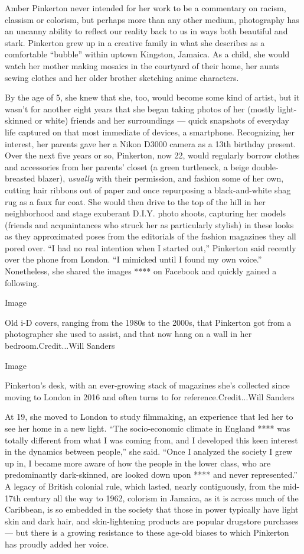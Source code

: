 Amber Pinkerton never intended for her work to be a commentary on
racism, classism or colorism, but perhaps more than any other medium,
photography has an uncanny ability to reflect our reality back to us in
ways both beautiful and stark. Pinkerton grew up in a creative family in
what she describes as a comfortable ``bubble'' within uptown Kingston,
Jamaica. As a child, she would watch her mother making mosaics in the
courtyard of their home, her aunts sewing clothes and her older brother
sketching anime characters.

By the age of 5, she knew that she, too, would become some kind of
artist, but it wasn't for another eight years that she began taking
photos of her (mostly light-skinned or white) friends and her
surroundings --- quick snapshots of everyday life captured on that most
immediate of devices, a smartphone. Recognizing her interest, her
parents gave her a Nikon D3000 camera as a 13th birthday present. Over
the next five years or so, Pinkerton, now 22, would regularly borrow
clothes and accessories from her parents' closet (a green turtleneck, a
beige double-breasted blazer), \emph{usually} with their permission, and
fashion some of her own, cutting hair ribbons out of paper and once
repurposing a black-and-white shag rug as a faux fur coat. She would
then drive to the top of the hill in her neighborhood and stage
exuberant D.I.Y. photo shoots, capturing her models (friends and
acquaintances who struck her as particularly stylish) in these looks as
they approximated poses from the editorials of the fashion magazines
they all pored over. ``I had no real intention when I started out,''
Pinkerton said recently over the phone from London. ``I mimicked until I
found my own voice.'' Nonetheless, she shared the images **** on
Facebook and quickly gained a following.

Image

Old i-D covers, ranging from the 1980s to the 2000s, that Pinkerton got
from a photographer she used to assist, and that now hang on a wall in
her bedroom.Credit...Will Sanders

Image

Pinkerton's desk, with an ever-growing stack of magazines she's
collected since moving to London in 2016 and often turns to for
reference.Credit...Will Sanders

At 19, she moved to London to study filmmaking, an experience that led
her to see her home in a new light. ``The socio-economic climate in
England **** was totally different from what I was coming from, and I
developed this keen interest in the dynamics between people,'' she said.
``Once I analyzed the society I grew up in, I became more aware of how
the people in the lower class, who are predominantly dark-skinned, are
looked down upon **** and never represented.'' A legacy of British
colonial rule, which lasted, nearly contiguously, from the mid-17th
century all the way to 1962, colorism in Jamaica, as it is across much
of the Caribbean, is so embedded in the society that those in power
typically have light skin and dark hair, and skin-lightening products
are popular drugstore purchases --- but there is a growing resistance to
these age-old biases to which Pinkerton has proudly added her voice.

